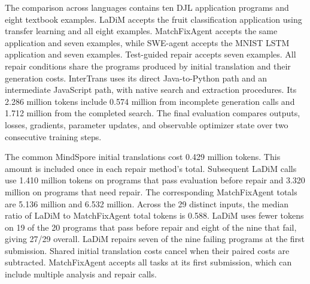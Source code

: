 \documentclass{article}
\begin{document}
The comparison across languages contains ten DJL application programs and eight textbook examples. LaDiM accepts the fruit classification application using transfer learning and all eight examples. MatchFixAgent accepts the same application and seven examples, while SWE-agent accepts the MNIST LSTM application and seven examples. Test-guided repair accepts seven examples. All repair conditions share the programs produced by initial translation and their generation costs. InterTrans uses its direct Java-to-Python path and an intermediate JavaScript path, with native search and extraction procedures. Its 2.286 million tokens include 0.574 million from incomplete generation calls and 1.712 million from the completed search. The final evaluation compares outputs, losses, gradients, parameter updates, and observable optimizer state over two consecutive training steps.

The common MindSpore initial translations cost 0.429 million tokens. This amount is included once in each repair method's total. Subsequent LaDiM calls use 1.410 million tokens on programs that pass evaluation before repair and 3.320 million on programs that need repair. The corresponding MatchFixAgent totals are 5.136 million and 6.532 million. Across the 29 distinct inputs, the median ratio of LaDiM to MatchFixAgent total tokens is 0.588. LaDiM uses fewer tokens on 19 of the 20 programs that pass before repair and eight of the nine that fail, giving 27/29 overall. LaDiM repairs seven of the nine failing programs at the first submission. Shared initial translation costs cancel when their paired costs are subtracted. MatchFixAgent accepts all tasks at its first submission, which can include multiple analysis and repair calls.
\end{document}
